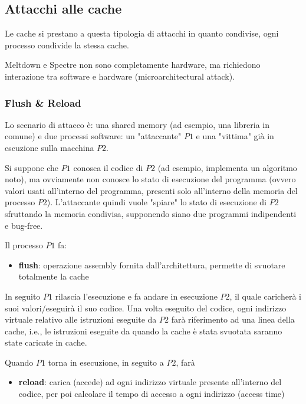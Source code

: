 \newpage

\subsection{Attacchi alle cache}

Le cache si prestano a questa tipologia di attacchi in quanto condivise, ogni processo condivide la stessa cache. 

Meltdown e Spectre non sono completamente hardware, ma richiedono interazione tra software e hardware (microarchitectural attack).

\subsubsection{Flush \& Reload}

Lo scenario di attacco è: una shared memory (ad esempio, una libreria in comune) e due processi software: un "attaccante" $P1$ e una "vittima" già in escuzione sulla macchina $P2$. 

Si suppone che $P1$ conosca il codice di $P2$ (ad esempio, implementa un algoritmo noto), ma ovviamente non conosce lo stato di esecuzione del programma (ovvero valori usati all'interno del programma, presenti solo all'interno della memoria del processo $P2$). L'attaccante quindi vuole "spiare" lo stato di esecuzione di $P2$ sfruttando la memoria condivisa, supponendo siano due programmi indipendenti e bug-free.

Il processo $P1$ fa: 
\begin{itemize}
	\item \textbf{flush}: operazione assembly fornita dall'architettura, permette di svuotare totalmente la cache
\end{itemize}

In seguito $P1$ rilascia l'esecuzione e fa andare in esecuzione $P2$, il quale caricherà i suoi valori/eseguirà il suo codice. Una volta eseguito del codice, ogni indirizzo virtuale relativo alle istruzioni eseguite da $P2$ farà riferimento ad una linea della cache, i.e., le istruzioni eseguite da quando la cache è stata svuotata saranno state caricate in cache.

Quando $P1$ torna in esecuzione, in seguito a $P2$, farà
\begin{itemize}
	\item \textbf{reload}: carica (accede) ad ogni indirizzo virtuale presente all'interno del codice, per poi calcolare il tempo di accesso a ogni indirizzo (access time)
\end{itemize}


